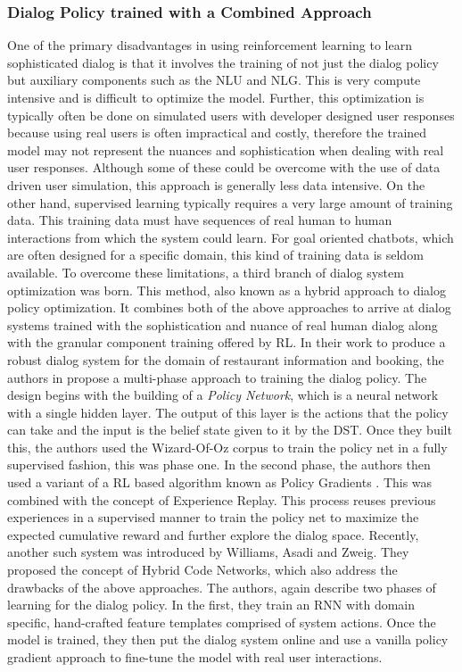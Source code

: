 \documentclass[14pt]{extarticle}
\numberwithin{equation}{section}
\begin{document}
	\subsubsection{Dialog Policy trained with a Combined Approach}
	One of the primary disadvantages in using reinforcement learning to learn sophisticated dialog is that it involves the training of not just the dialog policy but auxiliary components such as the NLU and NLG. This is very compute intensive and is difficult to optimize the model. Further, this optimization is typically often be done on simulated users with developer designed user responses because using real users is often impractical and costly, therefore the trained model may not represent the nuances and sophistication when dealing with real user responses.
	Although some of these could be overcome with the use of data driven user simulation, this approach is generally less data intensive.
	On the other hand, supervised learning typically requires a very large amount of training data. This training data must have sequences of real human to human interactions from which the system could learn. For goal oriented chatbots, which are often designed for a specific domain, this kind of training data is seldom available. To overcome these limitations, a third branch of dialog system optimization was born. This method, also known as a hybrid approach to dialog policy optimization. It combines both of the above approaches to arrive at dialog systems trained with the sophistication and nuance of real human dialog along with the granular component training offered by RL. In their work to produce a robust dialog system for the domain of restaurant information and booking, the authors in \cite{Su_continous_dm} propose a multi-phase approach to training the dialog policy. The design begins with the building of a \textit{Policy Network}, which is a neural network with a single hidden layer. The output of this layer is the actions that the policy can take and the input is the belief state given to it by the DST. Once they built this, the authors used the Wizard-Of-Oz corpus to train the policy net in a fully supervised fashion, this was phase one. In the second phase, the authors then used a variant\cite{Schulman_trpo} of a RL based algorithm known as Policy Gradients \cite{Sutton_pg}. This was combined with the concept of Experience Replay\cite{Lin1992}. This process reuses previous experiences in a supervised manner to train the policy net to maximize the expected cumulative reward and further explore the dialog space. Recently, another such system was introduced by Williams, Asadi and Zweig. They proposed the concept of Hybrid Code Networks\cite{Williams_HCN_e2e}, which also address the drawbacks of the above approaches. The authors, again describe two phases of learning for the dialog policy. In the first, they train an RNN with domain specific, hand-crafted feature templates comprised of system actions. Once the model is trained, they then put the dialog system online and use a vanilla policy gradient\cite{Sutton_pg} approach to fine-tune the model with real user interactions. 
	\pagebreak
\end{document}
